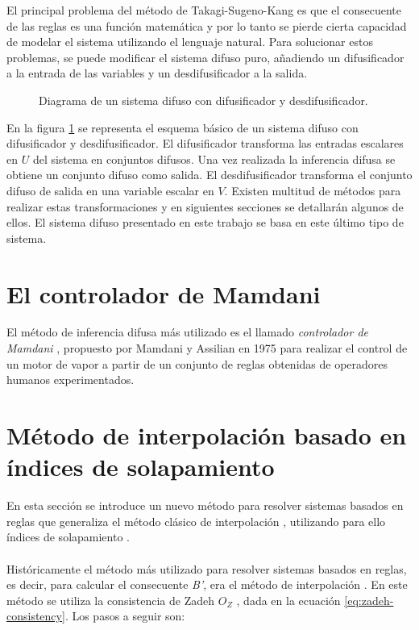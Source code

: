 El principal problema del método de Takagi-Sugeno-Kang es que el consecuente de las reglas es una función matemática y por lo tanto se pierde cierta capacidad de modelar el sistema utilizando el lenguaje natural. Para solucionar estos problemas, se puede modificar el sistema difuso puro, añadiendo un difusificador a la entrada de las variables y un desdifusificador a la salida.

\begin{figure}[tb]
	\centering
	
	\caption{Diagrama de un sistema difuso con difusificador y desdifusificador.}
	\label{fig:fuzzy-system}
\end{figure}

En la figura \ref{fig:fuzzy-system} se representa el esquema básico de un sistema difuso con difusificador y desdifusificador. El difusificador transforma las entradas escalares en $U$ del sistema en conjuntos difusos. Una vez realizada la inferencia difusa se obtiene un conjunto difuso como salida. El desdifusificador transforma el conjunto difuso de salida en una variable escalar en $V$. Existen multitud de métodos para realizar estas transformaciones y en siguientes secciones se detallarán algunos de ellos. El sistema difuso presentado en este trabajo se basa en este último tipo de sistema.

\section{El controlador de Mamdani}
El método de inferencia difusa más utilizado es el llamado \emph{controlador de Mamdani} \cite{Mamdani1975}, propuesto por Mamdani y Assilian en 1975 para realizar el control de un motor de vapor a partir de un conjunto de reglas obtenidas de operadores humanos experimentados.
\section{Método de interpolación basado en índices de solapamiento}
En esta sección se introduce un nuevo método para resolver sistemas basados en reglas que generaliza el método clásico de interpolación , utilizando para ello índices de solapamiento \cite{bustince2013overlap}.\\
\\
Históricamente el método más utilizado para resolver sistemas basados en reglas, es decir, para calcular el consecuente \emph{B'}, era el método de interpolación \cite{klir1987}. En este método se utiliza la consistencia de Zadeh \emph{$O_{Z}$} \cite{zadeh1978}, dada en la ecuación \ref{eq:zadeh-consistency}. Los pasos a seguir son:

